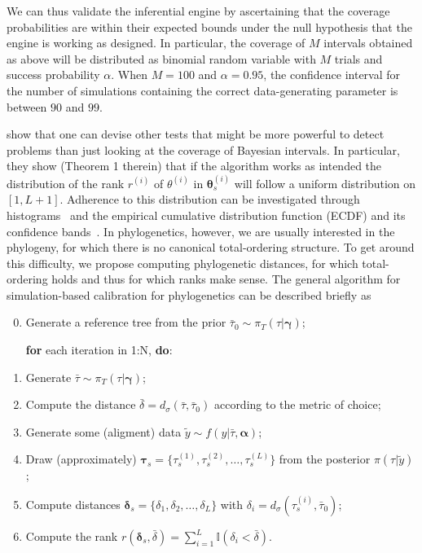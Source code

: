\documentclass[oneside]{article}
\begin{document}

We can thus validate the inferential engine by ascertaining that the coverage probabilities are within their expected bounds under the null hypothesis that the engine is working as designed.
In particular, the coverage of $M$ intervals obtained as above will be distributed as binomial random variable with $M$ trials and success probability $\alpha$.
When $M=100$ and $\alpha = 0.95$, the confidence interval for the number of simulations containing the correct data-generating parameter is between $90$ and $99$.
  
\cite{Talts2018} show that one can devise other tests that might be more powerful to detect problems than just looking at the coverage of Bayesian intervals.
In particular, they show (Theorem 1 therein) that if the algorithm works as intended the distribution of the rank $r^{(i)}$ of  $\theta^{(i)}$ in  $\boldsymbol\theta_s^{(i)}$ will follow a uniform distribution on $[1, L + 1]$.
Adherence to this distribution can be investigated through histograms~\citep{Talts2018} and the empirical cumulative distribution function (ECDF) and its confidence bands~\citep{Sailynoja2021}.
In phylogenetics, however, we are usually interested in the phylogeny, for which there is no canonical total-ordering structure. 
To get around this difficulty, we propose computing phylogenetic distances, for which total-ordering holds and thus for which ranks make sense.
The general algorithm for simulation-based calibration for phylogenetics can be described briefly as
\begin{enumerate}
\setcounter{enumi}{-1}
 \item Generate a reference tree from the prior $\bar{\tau}_0  \sim \pi_T(\tau | \boldsymbol \gamma)$;
 
 \textbf{for} each iteration in 1:N, \textbf{do}:
 
 \item Generate $\bar{\tau} \sim \pi_T(\tau | \boldsymbol \gamma)$;
 \item Compute the distance $\bar{\delta} = d_\sigma(\bar{\tau},\bar{\tau}_0)$ according to the metric of choice;
 \item Generate some (aligment) data $\tilde{y} \sim f(y | \bar{\tau}, \boldsymbol\alpha)$;
 \item Draw (approximately) $\boldsymbol \tau_s = \{\tau_s^{(1)}, \tau_s^{(2)}, \ldots, \tau_s^{(L)}\}$ from the posterior $\pi(\tau | \tilde{y})$;
 \item Compute distances $\boldsymbol \delta_s = \{ \delta_1, \delta_2, \ldots, \delta_L \}$  with $\delta_i = d_\sigma(\tau_s^{(i)}, \bar{\tau}_0)$;
 \item Compute the rank $r(\boldsymbol\delta_s, \bar{\delta}) = \sum\limits_{i=1}^L \mathbb{I}(\delta_i < \bar{\delta})$.
\end{enumerate}
\end{document}
